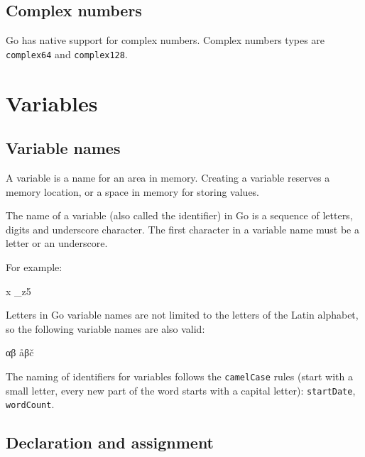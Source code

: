 \documentclass[]{book}
\newenvironment{Shaded}{\begin{snugshade}}{\end{snugshade}}
\newcommand{\NormalTok}[1]{#1}
\begin{document}
\hypertarget{complex-numbers}{%
\subsection{Complex numbers}\label{complex-numbers}}

Go has native support for complex numbers. Complex numbers types are
\texttt{complex64} and \texttt{complex128}.

\hypertarget{variables}{%
\section{Variables}\label{variables}}

\hypertarget{variable-names}{%
\subsection{Variable names}\label{variable-names}}

A variable is a name for an area in memory. Creating a variable reserves a
memory location, or a space in memory for storing values.

The name of a variable (also called the identifier) in Go is a sequence of
letters, digits and underscore character. The first character in a variable
name must be a letter or an underscore.

For example:

\begin{Shaded}
\begin{Highlighting}[]
\NormalTok{x}
\NormalTok{_z5}
\end{Highlighting}
\end{Shaded}

Letters in Go variable names are not limited to the letters of the Latin
alphabet, so the following variable names are also valid:

\begin{Shaded}
\begin{Highlighting}[]
\NormalTok{αβ}
\NormalTok{åβč}
\end{Highlighting}
\end{Shaded}

The naming of identifiers for variables follows the \texttt{camelCase} rules (start
with a small letter, every new part of the word starts with a capital letter):
\texttt{startDate}, \texttt{wordCount}.

\hypertarget{declaration-and-assignment}{%
\subsection{Declaration and assignment}\label{declaration-and-assignment}}
\end{document}
